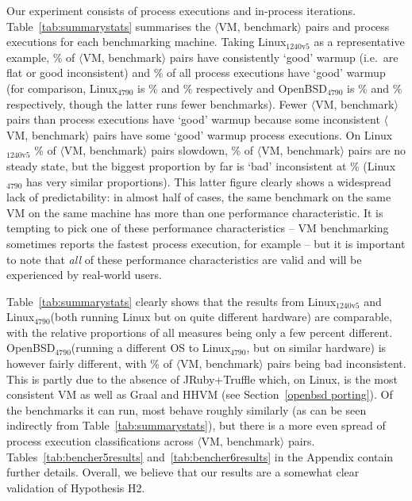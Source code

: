 \documentclass[acmlarge]{acmart}\settopmatter{printfolios=true}
\newcommand{\bencherfive}{Linux$_\mathrm{4790}$\xspace}
\newcommand{\benchersix}{OpenBSD$_\mathrm{4790}$\xspace}
\newcommand{\bencherseven}{Linux$_\mathrm{1240v5}$\xspace}
\newcommand{\vmbpair}{$\langle$VM, benchmark$\rangle$\xspace}
\begin{document}
Our experiment consists of \totalpexecs{} process executions and \totaliterations{} in-process
iterations. Table~\ref{tab:summarystats} summarises the \vmbpair pairs
and process executions for each benchmarking machine. Taking \bencherseven
as a representative example,
%
\result\% of \vmbpair pairs have consistently `good' warmup (i.e.~are flat
or good inconsistent) and
%
\result\% of all process executions have `good' warmup (for comparison, \bencherfive
is
%
\result\% and
%
\result\% respectively and \benchersix is
%
\result\% and
%
\result\% respectively, though the latter runs fewer benchmarks).
Fewer \vmbpair pairs than process executions have `good'
warmup because some inconsistent \vmbpair pairs have some `good' warmup
process executions. On \bencherseven
\benchersevenvmbenchpairsslowdownpercentage\% of \vmbpair pairs slowdown,
\benchersevenvmbenchpairsnosteadystatepercentage\% of \vmbpair pairs are no steady state,
but the biggest proportion by far is `bad' inconsistent at \benchersevenvmbenchpairsbadinconsistentpercentage\%
(\bencherfive has very similar proportions). This latter figure clearly shows a
widespread lack of predictability: in almost half of cases, the same benchmark
on the same VM on the same machine has more than one performance characteristic.
It is tempting to pick one of these performance characteristics -- VM
benchmarking sometimes reports the fastest process execution, for example -- but
it is important to note that \emph{all} of these performance characteristics are
valid and will be experienced by real-world users.

Table~\ref{tab:summarystats} clearly shows that the results from \bencherseven
and \bencherfive (both running Linux but on quite different hardware) are
comparable, with the relative proportions of all measures being only a few
percent different. \benchersix (running a different OS to \bencherfive, but on similar hardware)
is however fairly different, with \benchersixvmbenchpairsbadinconsistentpercentage\%
of \vmbpair pairs being bad inconsistent. This is partly due to the absence of
JRuby+Truffle which, on Linux, is the most consistent VM as well as Graal and HHVM
(see Section~\ref{openbsd porting}). Of the benchmarks it can run, most behave
roughly similarly (as can be seen indirectly from Table~\ref{tab:summarystats}), but
there is a more even spread of process execution classifications across \vmbpair pairs.
Tables~\ref{tab:bencher5results} and~\ref{tab:bencher6results} in the Appendix
contain further details. Overall, we believe that our results are a
somewhat clear validation of Hypothesis H2.
\end{document}
